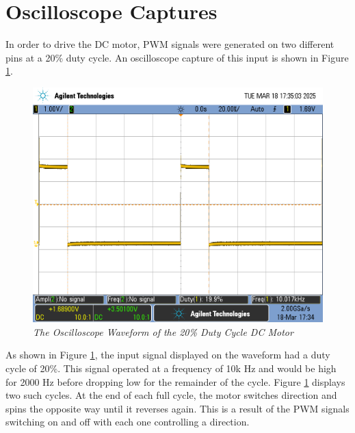 \documentclass[CMPE]{KGCOEReport}
\begin{document}
\section*{Oscilloscope Captures}
In order to drive the DC motor, PWM signals were generated on two different 
pins at a 20\% duty cycle. An oscilloscope capture of this input is shown in 
Figure \ref{fig:part1_1}. \\
\begin{figure}[H]
    \centering
    \includegraphics[width=1\textwidth]{Images/part1_1.png} %
    \caption{\textit{The Oscilloscope Waveform of the 20\% Duty Cycle DC Motor}}
    \label{fig:part1_1}
\end{figure}
As shown in Figure \ref{fig:part1_1}, the input signal displayed on the 
waveform had a duty cycle of 20\%. This signal operated at a frequency of 10k 
Hz and would be high for 2000 Hz before dropping low for the remainder of the 
cycle. Figure \ref{fig:part1_1} displays two such cycles. At the end of each 
full cycle, the motor switches direction and spins the opposite way until it 
reverses again. This is a result of the PWM signals switching on and off with 
each one controlling a direction. \\ \newpage
\end{document}
